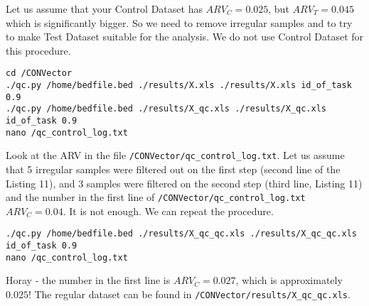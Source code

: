 \documentclass{article}
\begin{document}
\begin{usecase}
\end{usecase}

Let us assume that your Control Dataset has $ARV_C = 0.025$, but $ARV_T = 0.045$ which is significantly bigger. So we need to remove irregular samples and to try to make Test Dataset suitable for the analysis. We do not use Control Dataset for this procedure.

\begin{lstlisting}[style=DOS, caption={How to remove irregular samples}]
cd /CONVector
./qc.py /home/bedfile.bed ./results/X.xls ./results/X.xls id_of_task 0.9
./qc.py /home/bedfile.bed ./results/X_qc.xls ./results/X_qc.xls id_of_task 0.9
nano /qc_control_log.txt
\end{lstlisting}

Look at the ARV in the file \texttt{/CONVector/qc\_control\_log.txt}. Let us assume that 5 irregular samples were filtered out on the first step (second line of the Listing 11), and 3 samples were filtered on the second step (third line, Listing 11) and the number in the first line of \texttt{/CONVector/qc\_control\_log.txt} $ARV_C = 0.04$. It is not enough. We can repeat the procedure.

\begin{lstlisting}[style=DOS, caption={How to remove irregular samples iteratively}]
./qc.py /home/bedfile.bed ./results/X_qc_qc.xls ./results/X_qc_qc.xls id_of_task 0.9
nano /qc_control_log.txt
\end{lstlisting}

Horay - the number in the first line is $ARV_C = 0.027$, which is approximately $0.025$! The regular dataset can be found in \texttt{/CONVector/results/X\_qc\_qc.xls}.
\end{document}
